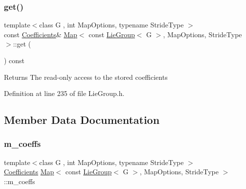 \subsubsection{\texorpdfstring{get()}{get()}\hspace{0.1cm}{\footnotesize\ttfamily [2/2]}}
{\footnotesize\ttfamily template$<$class G , int Map\+Options, typename Stride\+Type $>$ \\
const \hyperlink{class_map_3_01const_01_lie_group_3_01_g_01_4_00_01_map_options_00_01_stride_type_01_4_a670729f8e6ab1131541ef46da7d09274}{Coefficients}\& \hyperlink{class_map_3_01const_01_lie_group_3_01_g_01_4_00_01_map_options_00_01_stride_type_01_4_a95174b5f6c93ceefa0fbc6ef6fdf65f7}{Map}$<$ const \hyperlink{class_lie_group}{Lie\+Group}$<$ G $>$, Map\+Options, Stride\+Type $>$\+::get (\begin{DoxyParamCaption}{ }\end{DoxyParamCaption}) const\hspace{0.3cm}{\ttfamily [inline]}}

\begin{DoxyReturn}{Returns}
The read-\/only access to the stored coefficients 
\end{DoxyReturn}


Definition at line 235 of file Lie\+Group.\+h.



\subsection{Member Data Documentation}
\hypertarget{class_map_3_01const_01_lie_group_3_01_g_01_4_00_01_map_options_00_01_stride_type_01_4_a3dcc1fda9634e88e41a81209f408a8e8}{}\label{class_map_3_01const_01_lie_group_3_01_g_01_4_00_01_map_options_00_01_stride_type_01_4_a3dcc1fda9634e88e41a81209f408a8e8} 
\subsubsection{\texorpdfstring{m\+\_\+coeffs}{m\_coeffs}}
{\footnotesize\ttfamily template$<$class G , int Map\+Options, typename Stride\+Type $>$ \\
\hyperlink{class_map_3_01const_01_lie_group_3_01_g_01_4_00_01_map_options_00_01_stride_type_01_4_a670729f8e6ab1131541ef46da7d09274}{Coefficients} \hyperlink{class_map_3_01const_01_lie_group_3_01_g_01_4_00_01_map_options_00_01_stride_type_01_4_a95174b5f6c93ceefa0fbc6ef6fdf65f7}{Map}$<$ const \hyperlink{class_lie_group}{Lie\+Group}$<$ G $>$, Map\+Options, Stride\+Type $>$\+::m\+\_\+coeffs\hspace{0.3cm}{\ttfamily [protected]}}


